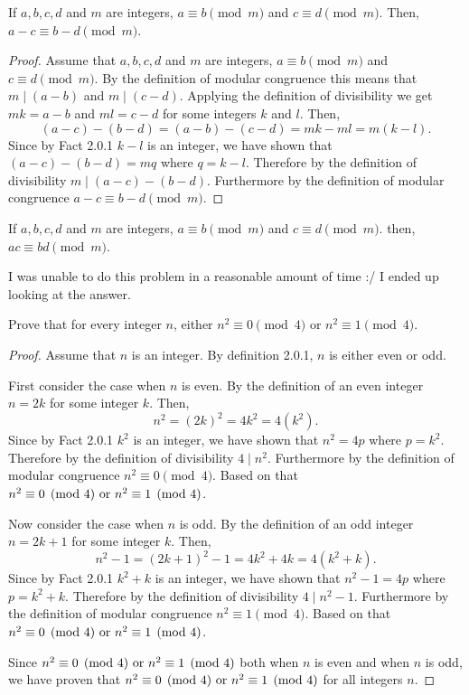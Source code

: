 \documentclass{report}
\begin{document}
\begin{proposition}{}{}
  If $a,b,c,d$ and $m$ are integers, $a \equiv b \pmod{m}$ and $c \equiv d \pmod{m}$. Then, $a - c \equiv b - d \pmod{m}$.
\end{proposition}

\begin{proof}
  Assume that $a,b,c,d$ and $m$ are integers, $a \equiv b \pmod{m}$ and $c \equiv d \pmod{m}$.
  By the definition of modular congruence this means that $m \mid (a - b)$ and $m \mid (c - d)$.
  Applying the definition of divisibility we get $mk = a - b$ and $ml = c - d$ for some integers $k$ and $l$.
  Then, $$(a - c) -(b - d) = (a - b) -(c - d) = mk - ml = m(k-l).$$
  Since by Fact 2.0.1 $k - l$ is an integer, we have shown that $(a - c) - (b - d) = mq$ where $q = k - l$.
  Therefore by the definition of divisibility $m \mid (a - c) - (b - d)$.
  Furthermore by the definition of modular congruence $a - c \equiv b - d \pmod{m}$.
\end{proof}

\begin{proposition}{}{}
  If $a,b,c,d$ and $m$ are integers, $a \equiv b \pmod{m}$ and $c \equiv d \pmod{m}$. then, $ac \equiv bd \pmod{m}$.
\end{proposition}

I was unable to do this problem in a reasonable amount of time :/ I ended up looking at the answer.

\begin{proposition}{}{}
  Prove that for every integer $n$, either $n^2 \equiv 0 \pmod{4}$ or $n^2 \equiv 1 \pmod{4}$.
\end{proposition}

\begin{proof}
  Assume that $n$ is an integer. By definition 2.0.1, $n$ is either even or odd.

  First consider the case when $n$ is even. By the definition of an even integer $n = 2k$ for some integer $k$.
  Then, $$n^2 = (2k)^2 = 4k^2 = 4(k^2).$$
  Since by Fact 2.0.1 $k^2$ is an integer, we have shown that $n^2 = 4p$ where $p = k^2$.
  Therefore by the definition of divisibility $4 \mid n^2$.
  Furthermore by the definition of modular congruence $n^2 \equiv 0 \pmod{4}$.
  Based on that $n^2 \equiv 0 \pmod{4} \text{ or } n^2 \equiv 1 \pmod{4}$.

  Now consider the case when $n$ is odd. By the definition of an odd integer $n = 2k + 1$ for some integer $k$.
  Then, $$n^2 - 1 = (2k+1)^2 - 1 = 4k^2+4k= 4(k^2+k).$$
  Since by Fact 2.0.1 $k^2+k$ is an integer, we have shown that $n^2 - 1 = 4p$ where $p = k^2+k$.
  Therefore by the definition of divisibility $4 \mid n^2 - 1$.
  Furthermore by the definition of modular congruence $n^2 \equiv 1 \pmod{4}$.
  Based on that $n^2 \equiv 0 \pmod{4} \text{ or } n^2 \equiv 1 \pmod{4}$.

  Since $n^2 \equiv 0 \pmod{4} \text{ or } n^2 \equiv 1 \pmod{4}$ both when $n$ is even and when $n$ is odd,
  we have proven that $n^2 \equiv 0 \pmod{4} \text{ or } n^2 \equiv 1 \pmod{4}$ for all integers $n$.
\end{proof}
\end{document}
